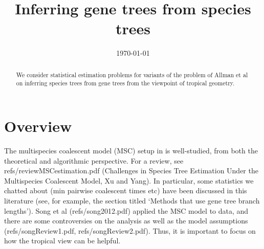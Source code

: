 \documentclass[12pt]{amsart}
\title{Inferring gene trees from species trees}
\author{}
\date{\today}
\theoremstyle{plain}
\theoremstyle{definition}
\begin{document}
\begin{abstract}
We consider statistical estimation problems for variants of the problem of Allman et al on inferring species trees from gene trees from the viewpoint of tropical geometry. 
\end{abstract}

\maketitle

\section{Overview}

The multispecies coalescent model (MSC) setup in \cite{Allman1,Allman2}  is well-studied, from both the theoretical and algorithmic perspective. For a review, see refs/reviewMSCestimation.pdf (Challenges in Species Tree Estimation Under the
Multispecies Coalescent Model, Xu and Yang). In particular, some statistics we chatted about (min pairwise coalescent times etc) have been discussed in this literature (see, for example, the section titled `Methods that use gene tree branch lengths').
Song et al (refs/song2012.pdf) applied the MSC model to data, and there are some controversies on the analysis as well as the model assumptions (refs/songReview1.pdf, refs/songReview2.pdf). 
 Thus, it is important to focus on how the tropical view can be helpful. 
\vskip12pt




\end{document}
